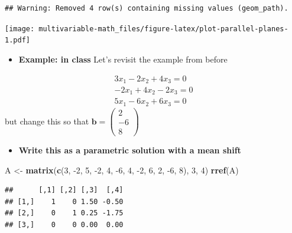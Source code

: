 \documentclass[
]{book}
\newenvironment{Shaded}{\begin{snugshade}}{\end{snugshade}}
\newcommand{\DecValTok}[1]{\textcolor[rgb]{0.00,0.00,0.81}{#1}}
\newcommand{\KeywordTok}[1]{\textcolor[rgb]{0.13,0.29,0.53}{\textbf{#1}}}
\newcommand{\NormalTok}[1]{#1}
\newcommand{\StringTok}[1]{\textcolor[rgb]{0.31,0.60,0.02}{#1}}
\providecommand{\tightlist}{%
  \setlength{\itemsep}{0pt}\setlength{\parskip}{0pt}}
\theoremstyle{definition}
\theoremstyle{definition}
\theoremstyle{definition}
\theoremstyle{definition}
\theoremstyle{remark}
\begin{document}
\begin{verbatim}
## Warning: Removed 4 row(s) containing missing values (geom_path).
\end{verbatim}

\texttt{[image: multivariable-math\_files/figure-latex/plot-parallel-planes-1.pdf]}

\begin{itemize}
\tightlist
\item
  \textbf{Example: in class}
  Let's revisit the example from before
\end{itemize}

\[
\begin{aligned}
3 x_1 - 2 x_2 + 4 x_3 = 0 \\
- 2 x_1 + 4 x_2 - 2 x_3 = 0 \\
5 x_1 - 6 x_2 + 6 x_3 = 0
\end{aligned}
\]
but change this so that \(\mathbf{b} = \begin{pmatrix} 2 \\ -6 \\ 8 \end{pmatrix}\)

\begin{itemize}
\tightlist
\item
  \textbf{Write this as a parametric solution with a mean shift}
\end{itemize}

\begin{Shaded}
\begin{Highlighting}[]
\NormalTok{A <-}\StringTok{ }\KeywordTok{matrix}\NormalTok{(}\KeywordTok{c}\NormalTok{(}\DecValTok{3}\NormalTok{, }\DecValTok{-2}\NormalTok{, }\DecValTok{5}\NormalTok{, }\DecValTok{-2}\NormalTok{, }\DecValTok{4}\NormalTok{, }\DecValTok{-6}\NormalTok{, }\DecValTok{4}\NormalTok{, }\DecValTok{-2}\NormalTok{, }\DecValTok{6}\NormalTok{, }\DecValTok{2}\NormalTok{, }\DecValTok{-6}\NormalTok{, }\DecValTok{8}\NormalTok{), }\DecValTok{3}\NormalTok{, }\DecValTok{4}\NormalTok{)}
\KeywordTok{rref}\NormalTok{(A)}
\end{Highlighting}
\end{Shaded}

\begin{verbatim}
##      [,1] [,2] [,3]  [,4]
## [1,]    1    0 1.50 -0.50
## [2,]    0    1 0.25 -1.75
## [3,]    0    0 0.00  0.00
\end{verbatim}
\end{document}
